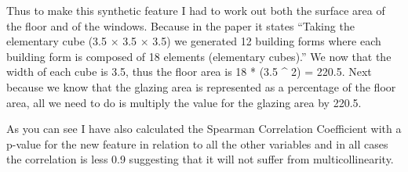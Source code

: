 \documentclass[11pt]{article}
\begin{document}
Thus to make this synthetic feature I had to work out both the surface
area of the floor and of the windows. Because in the paper it states
``Taking the elementary cube (3.5 × 3.5 × 3.5) we generated 12 building
forms where each building form is composed of 18 elements (elementary
cubes).'' We now that the width of each cube is 3.5, thus the floor area
is 18 * (3.5 \^{} 2) = 220.5. Next because we know that the glazing area
is represented as a percentage of the floor area, all we need to do is
multiply the value for the glazing area by 220.5.

As you can see I have also calculated the Spearman Correlation
Coefficient with a p-value for the new feature in relation to all the
other variables and in all cases the correlation is less 0.9 suggesting
that it will not suffer from multicollinearity.
\end{document}
